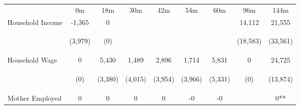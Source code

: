 \begin{tabular}{lcccccccc}
\hline \noalign{\smallskip} & 0m & 18m & 30m & 42m & 54m & 60m & 96m & 144m\\
\noalign{\smallskip}\hline \noalign{\smallskip}Household Income & -1,365 & 0 &  &  &  &  & 14,112 & 21,555\\
 & \begin{footnotesize}(3,979)\end{footnotesize} & \begin{footnotesize}(0)\end{footnotesize} & \begin{footnotesize}\end{footnotesize} & \begin{footnotesize}\end{footnotesize} & \begin{footnotesize}\end{footnotesize} & \begin{footnotesize}\end{footnotesize} & \begin{footnotesize}(18,583)\end{footnotesize} & \begin{footnotesize}(33,561)\end{footnotesize}\\
\noalign{\smallskip}Household Wage & 0 & 5,430 & 1,489 & 2,896 & 1,714 & 5,831 & 0 & 24,725\\
 & \begin{footnotesize}(0)\end{footnotesize} & \begin{footnotesize}(3,380)\end{footnotesize} & \begin{footnotesize}(4,015)\end{footnotesize} & \begin{footnotesize}(3,954)\end{footnotesize} & \begin{footnotesize}(3,966)\end{footnotesize} & \begin{footnotesize}(5,331)\end{footnotesize} & \begin{footnotesize}(0)\end{footnotesize} & \begin{footnotesize}(13,874)\end{footnotesize}\\
\noalign{\smallskip}Mother Employed & 0 & 0 & 0 & 0 & -0 & -0 &  & 0**\\

\end{tabular}

